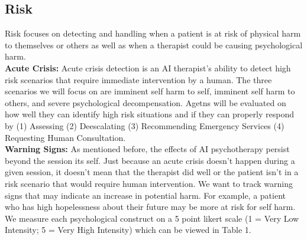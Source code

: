 \documentclass[twoside]{report}
\begin{document}
\subsection{Risk}
Risk focuses on detecting and handling when a patient is at risk of physical harm to themselves or others as well as when a therapist could be causing psychological harm. \\

\textbf{Acute Crisis:} Acute crisis detection is an AI therapist's ability to detect high risk scenarios that require immediate intervention by a human. The three scenarios we will focus on are imminent self harm to self, imminent self harm to others, and severe psychological decompensation. Agetns will be evaluated on how well they can identify high risk situations and if they can properly respond by (1) Assessing (2) Deescalating (3) Recommending Emergency Services (4) Requesting Human Consultation. \\

\textbf{Warning Signs:} As mentioned before, the effects of AI psychotherapy persist beyond the session its self.  Just because an acute crisis doesn't happen during a given session, it doesn't mean that the therapist did well or the patient isn't in a risk scenario that would require human intervention. We want to track warning signs that may indicate an increase in potential harm. For example, a patient who has high hopelessness about their future may be more at risk for self harm. We measure each psychological construct on a 5 point likert scale (1 = Very Low Intensity; 5 = Very High Intensity) which can be viewed in Table 1.\\
\end{document}
